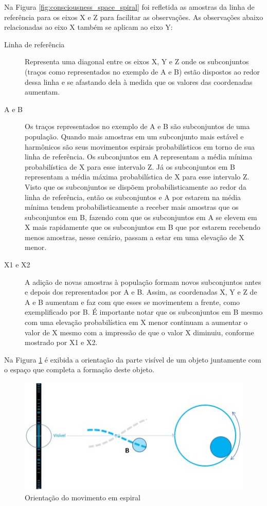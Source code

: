 Na Figura \ref{fig:consciousness_space_spiral} foi refletida as amostras da linha de referência para os eixos X e Z para facilitar as observações. As observações abaixo relacionadas ao eixo X também se aplicam ao eixo Y:
	\begin{description}
	   \item[Linha de referência] Representa uma diagonal entre os eixos X, Y e Z onde os subconjuntos (traços como representados no exemplo de A e B) estão dispostos ao redor dessa linha e se afastando dela à medida que os valores das coordenadas aumentam.
	   \item[A e B] Os traços representados no exemplo de A e B são subconjuntos de uma população. Quando mais amostras em um subconjunto mais estável e harmônicos são seus movimentos espirais probabilísticos em torno de sua linha de referência. Os subconjuntos em A representam a média mínima probabilística de X para esse intervalo Z. Já os subconjuntos em B representam a média máxima probabilística de X para esse intervalo Z. Visto que os subconjuntos se dispõem probabilisticamente ao redor da linha de referência, então os subconjuntos e A por estarem na média mínima tendem probabilisticamente a receber mais amostras que os subconjuntos em B, fazendo com que os subconjuntos em A se elevem em X mais rapidamente que os subconjuntos em B que por estarem recebendo menos amostras, nesse cenário, passam a estar em uma elevação de X menor.
	   \item[X1 e X2] A adição de novas amostras à população formam novos subconjuntos antes e depois dos representados por A e B. Assim, as coordenadas X, Y e Z de A e B aumentam e faz com que esses se movimentem a frente, como exemplificado por B. É importante notar que os subconjuntos em B mesmo com uma elevação probabilística em X menor continuam a aumentar o valor de X mesmo com a impressão de que o valor X diminuiu, conforme mostrado por X1 e X2.
	\end{description}

Na Figura \ref{fig:consciousness_space_spiral_direction} é exibida a orientação da parte visível de um objeto juntamente com o espaço que completa a formação deste objeto.
	\begin{figure}[H]
	\caption{Orientação do movimento em espiral}
	\label{fig:consciousness_space_spiral_direction}
	\centering
	\includegraphics[scale=1]{sections/images/consciousness_space_spiral_direction.jpg}
	\end{figure}
	
